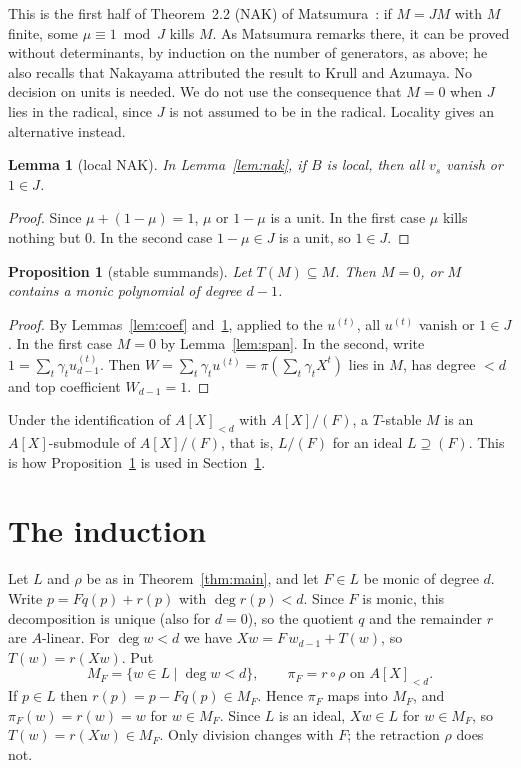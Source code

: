 \documentclass[11pt]{amsart}
\newtheorem{proposition}[theorem]{Proposition}
\newtheorem{lemma}[theorem]{Lemma}
\theoremstyle{remark}
\begin{document}
This is the first half of Theorem~2.2 (NAK) of Matsumura~\cite{Mat}: if
$M=JM$ with $M$ finite, some $\mu\equiv1\bmod J$ kills $M$. As Matsumura
remarks there, it can be proved without determinants, by induction on the
number of generators, as above; he also recalls that Nakayama attributed the
result to Krull and Azumaya. No decision on units is needed. We do not use
the consequence that $M=0$ when $J$ lies in the radical, since $J$ is not
assumed to be in the radical. Locality gives an alternative instead.

\begin{lemma}[local NAK]\label{lem:local}
In Lemma~\ref{lem:nak}, if $B$ is local, then all $v_s$ vanish or $1\in J$.
\end{lemma}

\begin{proof}
Since $\mu+(1-\mu)=1$, $\mu$ or $1-\mu$ is a unit. In the first case $\mu$
kills nothing but $0$. In the second case $1-\mu\in J$ is a unit, so $1\in J$.
\end{proof}

\begin{proposition}[stable summands]\label{prop:stable}
Let $T(M)\subseteq M$. Then $M=0$, or $M$ contains a monic
polynomial of degree $d-1$.
\end{proposition}

\begin{proof}
By Lemmas~\ref{lem:coef} and~\ref{lem:local}, applied to the $u^{(t)}$, all
$u^{(t)}$ vanish or $1\in J$. In the first case $M=0$ by
Lemma~\ref{lem:span}. In the second, write $1=\sum_t\gamma_tu^{(t)}_{d-1}$.
Then $W=\sum_t\gamma_tu^{(t)}=\pi(\sum_t\gamma_tX^t)$ lies in $M$, has degree
$<d$ and top coefficient $W_{d-1}=1$.
\end{proof}

Under the identification of $A[X]_{<d}$ with $A[X]/(F)$, a $T$-stable $M$
is an $A[X]$-submodule of $A[X]/(F)$, that is, $L/(F)$ for an ideal
$L\supseteq(F)$. This is how Proposition~\ref{prop:stable} is used in
Section~\ref{sec:induction}.

\section{The induction}\label{sec:induction}

Let $L$ and $\rho$ be as in Theorem~\ref{thm:main}, and let $F\in L$ be monic
of degree $d$. Write $p=Fq(p)+r(p)$ with $\deg r(p)<d$. Since $F$ is monic,
this decomposition is unique (also for $d=0$), so the quotient $q$ and the
remainder $r$ are $A$-linear. For $\deg w<d$ we have $Xw=F\,w_{d-1}+T(w)$,
so $T(w)=r(Xw)$. Put
\[
M_F=\{w\in L\mid \deg w<d\},\qquad \pi_F=r\circ\rho \text{ on } A[X]_{<d}.
\]
If $p\in L$ then $r(p)=p-Fq(p)\in M_F$. Hence $\pi_F$ maps into $M_F$,
and $\pi_F(w)=r(w)=w$ for $w\in M_F$. Since $L$ is an ideal, $Xw\in L$ for
$w\in M_F$, so $T(w)=r(Xw)\in M_F$. Only division changes with $F$; the
retraction $\rho$ does not.
\end{document}
